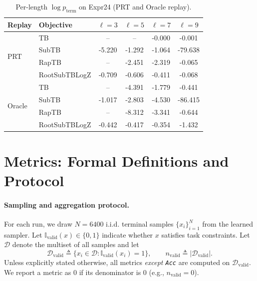 \documentclass{article}
\theoremstyle{plain}
\theoremstyle{definition}
\theoremstyle{remark}
\begin{document}
\begin{table}[!htbp]
\centering
\small
\setlength{\tabcolsep}{5pt}
\renewcommand{\arraystretch}{1.05}
\begin{tabular}{llcccc}
\toprule
Replay & Objective & $\ell=3$ & $\ell=5$ & $\ell=7$ & $\ell=9$ \\
\midrule
\multirow{4}{*}{PRT} & TB            & --     & --     & -0.000 & -0.001 \\
                        & SubTB         & -5.220 & -1.292 & -1.064 & -79.638 \\
                        & RapTB         & --     & -2.451 & -2.319 & -0.065 \\
                        & RootSubTBLogZ & -0.709 & -0.606 & -0.411 & -0.068 \\
\midrule
\multirow{4}{*}{Oracle} & TB            & --     & -4.391 & -1.779 & -0.441 \\
                        & SubTB         & -1.017 & -2.803 & -4.530 & -86.415 \\
                        & RapTB         & --     & -8.312 & -3.341 & -0.644 \\
                        & RootSubTBLogZ & -0.442 & -0.417 & -0.354 & -1.432 \\
\bottomrule
\end{tabular}
\caption{Per-length $\log p_{\text{term}}$ on Expr24 (PRT and Oracle replay).}
\label{tab:expr24_pterm_by_len}
\end{table}


























\section{Metrics: Formal Definitions and Protocol}
\label{app:metrics}
\newcommand{\valid}{\mathrm{valid}}

\paragraph{Sampling and aggregation protocol.}
For each run, we draw $N{=}6400$ i.i.d. terminal samples $\{x_i\}_{i=1}^N$ from the learned sampler.
Let $\mathbb{I}_{\valid}(x)\in\{0,1\}$ indicate whether $x$ satisfies task constraints.
Let $\mathcal{D}$ denote the multiset of all samples and let
\[
\mathcal{D}_{\valid}\triangleq \{x_i\in\mathcal{D}:\mathbb{I}_{\valid}(x_i)=1\},\qquad
n_{\valid}\triangleq |\mathcal{D}_{\valid}|.
\]
Unless explicitly stated otherwise, all metrics \emph{except \texttt{Acc}} are computed on $\mathcal{D}_{\valid}$.
We report a metric as $0$ if its denominator is $0$ (e.g., $n_{\valid}=0$).
\end{document}
